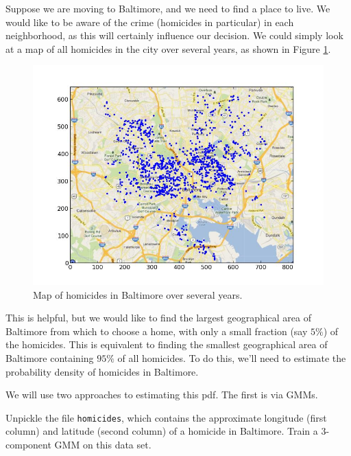 
Suppose we are moving to Baltimore, and we need to find a place to live. We would like to be aware of the crime (homicides in particular) in each neighborhood, as this will certainly influence our decision. We could simply look at a map of all homicides in the city over several years, as shown in Figure \ref{fig:baltimorehomicides}.

\begin{figure}[h]
\centering
\includegraphics[width=\textwidth]{baltimorecrimemap.jpeg}
\caption{Map of homicides in Baltimore over several years.}
\label{fig:baltimorehomicides}
\end{figure}

This is helpful, but we would like to find the largest geographical area of Baltimore from which to choose a home, with only a small fraction (say $5\%$) of the homicides. This is equivalent to finding the smallest geographical area of Baltimore containing $95\%$ of all homicides. To do this, we'll need to estimate the probability density of homicides in Baltimore.

We will use two approaches to estimating this pdf. The first is via GMMs.

\begin{problem}
Unpickle the file \texttt{homicides}, which contains the approximate longitude (first column) and latitude (second column) of a homicide in Baltimore. Train a $3$-component GMM on this data set.
\end{problem}

